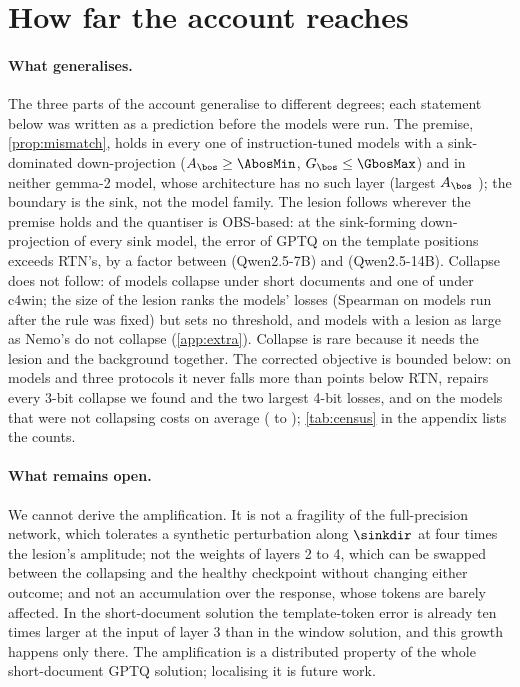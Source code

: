 \section{How far the account reaches}
\label{sec:universality}
\paragraph{What generalises.}
The three parts of the account generalise to different degrees; each statement below was written as a prediction before the models were run.
The premise, \cref{prop:mismatch}, holds in every one of \nSink{} instruction-tuned models with a sink-dominated down-projection ($A_{\bos}\ge\AbosMin$, $G_{\bos}\le\GbosMax$) and in neither gemma-2 model, whose architecture has no such layer (largest $A_{\bos}$ \GemmaAbosMax{}); the boundary is the sink, not the model family.
The lesion follows wherever the premise holds and the quantiser is OBS-based: at the sink-forming down-projection of every sink model, the error of GPTQ on the template positions exceeds RTN's, by a factor between \LesionRatioMin{} (Qwen2.5-7B) and \LesionRatioMax{} (Qwen2.5-14B).
Collapse does not follow: \nCollapse{} of \nCensus{} models collapse under short documents and one of \nWin{} under c4win; the size of the lesion ranks the models' losses (Spearman \LesionSpearman{} on \nBlind{} models run after the rule was fixed) but sets no threshold, and models with a lesion as large as Nemo's do not collapse (\cref{app:extra}).
Collapse is rare because it needs the lesion and the background together.
The corrected objective is bounded below: on \nCorr{} models and three protocols it never falls more than \CorrWorstVsRTN{} points below RTN, repairs every 3-bit collapse we found and the two largest 4-bit losses, and on the \nHealthy{} models that were not collapsing costs \CorrHealthyMean{} on average (\CorrHealthyWorst{} to \CorrHealthyBest{}); \cref{tab:census} in the appendix lists the counts.

\paragraph{What remains open.}
We cannot derive the amplification.
It is not a fragility of the full-precision network, which tolerates a synthetic perturbation along $\sinkdir$ at four times the lesion's amplitude; not the weights of layers 2 to 4, which can be swapped between the collapsing and the healthy checkpoint without changing either outcome; and not an accumulation over the response, whose tokens are barely affected.
In the short-document solution the template-token error is already ten times larger at the input of layer 3 than in the window solution, and this growth happens only there.
The amplification is a distributed property of the whole short-document GPTQ solution; localising it is future work.


